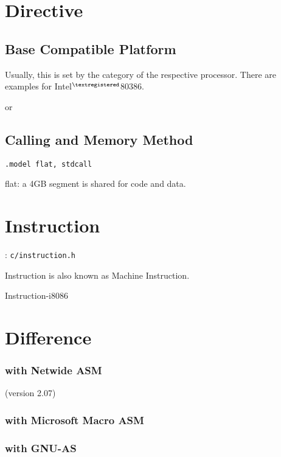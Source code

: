 
\section{Directive}

\subsection{Base Compatible Platform}

Usually, this is set by the category of the respective processor.
There are examples for Intel$^{\textregistered}$80386.


 or \T{[CPU 386]}




\subsection{Calling and Memory Method}


\verb`.model flat, stdcall` 

flat: a 4GB segment is shared for code and data.

\section{Instruction}
: \verb`c/instruction.h`


Instruction is also known as {Machine Instruction}.

{Instruction-i8086}

\section{Difference}

\subsubsection{with Netwide ASM} (version 2.07)


\subsubsection{with Microsoft Macro ASM}


\subsubsection{with GNU-AS}

